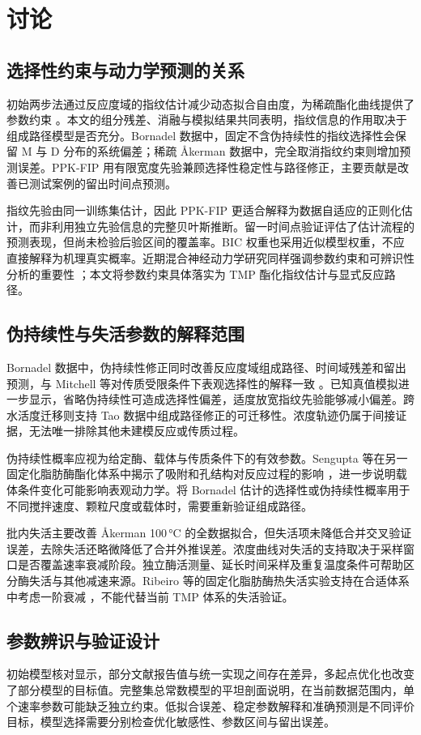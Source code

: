 \section{讨论}
\subsection{选择性约束与动力学预测的关系}
初始两步法通过反应度域的指纹估计减少动态拟合自由度，为稀疏酯化曲线提供了参数约束 \cite{nishimura2026}。本文的组分残差、消融与模拟结果共同表明，指纹信息的作用取决于组成路径模型是否充分。Bornadel 数据中，固定不含伪持续性的指纹选择性会保留 M 与 D 分布的系统偏差；稀疏 Åkerman 数据中，完全取消指纹约束则增加预测误差。PPK-FIP 用有限宽度先验兼顾选择性稳定性与路径修正，主要贡献是改善已测试案例的留出时间点预测。

指纹先验由同一训练集估计，因此 PPK-FIP 更适合解释为数据自适应的正则化估计，而非利用独立先验信息的完整贝叶斯推断。留一时间点验证评估了估计流程的预测表现，但尚未检验后验区间的覆盖率。BIC 权重也采用近似模型权重，不应直接解释为机理真实概率。近期混合神经动力学研究同样强调参数约束和可辨识性分析的重要性 \cite{giampiccolo2024,derooij2025}；本文将参数约束具体落实为 TMP 酯化指纹估计与显式反应路径。

\subsection{伪持续性与失活参数的解释范围}
Bornadel 数据中，伪持续性修正同时改善反应度域组成路径、时间域残差和留出预测，与 Mitchell 等对传质受限条件下表观选择性的解释一致 \cite{mitchell2023}。已知真值模拟进一步显示，省略伪持续性可造成选择性偏差，适度放宽指纹先验能够减小偏差。跨水活度迁移则支持 Tao 数据中组成路径修正的可迁移性。浓度轨迹仍属于间接证据，无法唯一排除其他未建模反应或传质过程。

伪持续性概率应视为给定酶、载体与传质条件下的有效参数。Sengupta 等在另一固定化脂肪酶酯化体系中揭示了吸附和孔结构对反应过程的影响 \cite{sengupta2026}，进一步说明载体条件变化可能影响表观动力学。将 Bornadel 估计的选择性或伪持续性概率用于不同搅拌速度、颗粒尺度或载体时，需要重新验证组成路径。

批内失活主要改善 Åkerman 100\,°C 的全数据拟合，但失活项未降低合并交叉验证误差，去除失活还略微降低了合并外推误差。浓度曲线对失活的支持取决于采样窗口是否覆盖速率衰减阶段。独立酶活测量、延长时间采样及重复温度条件可帮助区分酶失活与其他减速来源。Ribeiro 等的固定化脂肪酶热失活实验支持在合适体系中考虑一阶衰减 \cite{ribeiro2025}，不能代替当前 TMP 体系的失活验证。

\subsection{参数辨识与验证设计}
初始模型核对显示，部分文献报告值与统一实现之间存在差异，多起点优化也改变了部分模型的目标值。完整集总常数模型的平坦剖面说明，在当前数据范围内，单个速率参数可能缺乏独立约束。低拟合误差、稳定参数解释和准确预测是不同评价目标，模型选择需要分别检查优化敏感性、参数区间与留出误差。

